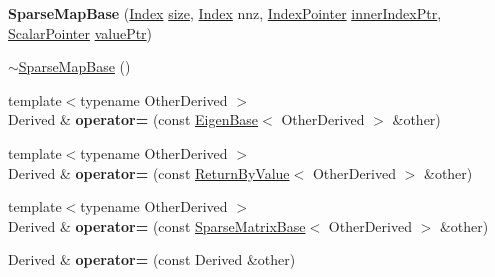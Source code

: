 \begin{DoxyCompactItemize}
{\bfseries Sparse\+Map\+Base} (\mbox{\hyperlink{struct_eigen_1_1_eigen_base_a554f30542cc2316add4b1ea0a492ff02}{Index}} \mbox{\hyperlink{class_eigen_1_1_sparse_matrix_base_a124bc57921775eb9aa2dfd9727e23472}{size}}, \mbox{\hyperlink{struct_eigen_1_1_eigen_base_a554f30542cc2316add4b1ea0a492ff02}{Index}} nnz, \mbox{\hyperlink{struct_eigen_1_1internal_1_1true__type}{Index\+Pointer}} \mbox{\hyperlink{class_eigen_1_1_sparse_map_base_3_01_derived_00_01_read_only_accessors_01_4_ab044564756f472877b2c1a5706e540e2}{inner\+Index\+Ptr}}, \mbox{\hyperlink{struct_eigen_1_1internal_1_1true__type}{Scalar\+Pointer}} \mbox{\hyperlink{class_eigen_1_1_sparse_map_base_3_01_derived_00_01_read_only_accessors_01_4_a574ea9371c22eabebdda21c0787312dc}{value\+Ptr}})
\item 
\mbox{\hyperlink{class_eigen_1_1_sparse_map_base_3_01_derived_00_01_read_only_accessors_01_4_ab375aedf824909a7f1a6af24ee60d70f}{$\sim$\+Sparse\+Map\+Base}} ()
\item 
\mbox{\label{class_eigen_1_1_sparse_map_base_3_01_derived_00_01_read_only_accessors_01_4_a379e2a65ec661cceaddc225120ad5cb1}} 
{\footnotesize template$<$typename Other\+Derived $>$ }\\Derived \& {\bfseries operator=} (const \mbox{\hyperlink{struct_eigen_1_1_eigen_base}{Eigen\+Base}}$<$ Other\+Derived $>$ \&other)
\item 
\mbox{\label{class_eigen_1_1_sparse_map_base_3_01_derived_00_01_read_only_accessors_01_4_a3365b1d14b9f6c5d832169b3d07511a4}} 
{\footnotesize template$<$typename Other\+Derived $>$ }\\Derived \& {\bfseries operator=} (const \mbox{\hyperlink{class_eigen_1_1_return_by_value}{Return\+By\+Value}}$<$ Other\+Derived $>$ \&other)
\item 
\mbox{\label{class_eigen_1_1_sparse_map_base_3_01_derived_00_01_read_only_accessors_01_4_aa171e4de58f2bddb8da0358961c6d3fd}} 
{\footnotesize template$<$typename Other\+Derived $>$ }\\Derived \& {\bfseries operator=} (const \mbox{\hyperlink{class_eigen_1_1_sparse_matrix_base}{Sparse\+Matrix\+Base}}$<$ Other\+Derived $>$ \&other)
\item 
\mbox{\label{class_eigen_1_1_sparse_map_base_3_01_derived_00_01_read_only_accessors_01_4_af2eba8c3ea2424df618f3e90f1b5254b}} 
Derived \& {\bfseries operator=} (const Derived \&other)
\end{DoxyCompactItemize}
